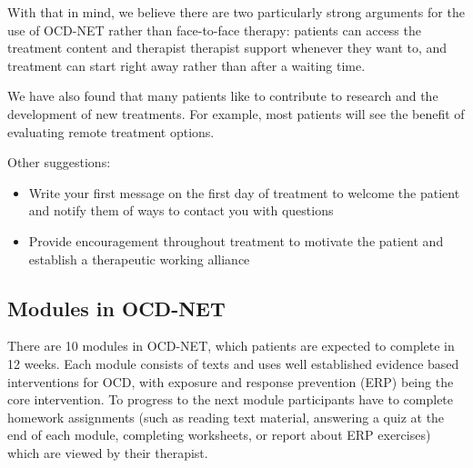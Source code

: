 \documentclass[]{book}
\providecommand{\tightlist}{%
  \setlength{\itemsep}{0pt}\setlength{\parskip}{0pt}}
\theoremstyle{definition}
\theoremstyle{definition}
\theoremstyle{definition}
\theoremstyle{remark}
\begin{document}
With that in mind, we believe there are two particularly strong
arguments for the use of OCD-NET rather than face-to-face therapy:
patients can access the treatment content and therapist therapist
support whenever they want to, and treatment can start right away rather
than after a waiting time.

We have also found that many patients like to contribute to research and
the development of new treatments. For example, most patients will see
the benefit of evaluating remote treatment options.

Other suggestions:

\begin{itemize}
\tightlist
\item
  Write your first message on the first day of treatment to welcome the
  patient and notify them of ways to contact you with questions
\item
  Provide encouragement throughout treatment to motivate the patient and
  establish a therapeutic working alliance
\end{itemize}

\hypertarget{modules-in-ocd-net}{%
\subsection{Modules in OCD-NET}\label{modules-in-ocd-net}}

There are 10 modules in OCD-NET, which patients are expected to complete
in 12 weeks. Each module consists of texts and uses well established
evidence based interventions for OCD, with exposure and response
prevention (ERP) being the core intervention. To progress to the next
module participants have to complete homework assignments (such as
reading text material, answering a quiz at the end of each module,
completing worksheets, or report about ERP exercises) which are viewed
by their therapist.
\end{document}
